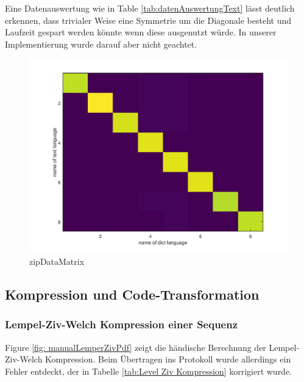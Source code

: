\documentclass[12pt,german]{article}
\begin{document}
Eine Datenauswertung wie in Table \ref{tab:datenAuswertungText} lässt deutlich erkennen, dass trivialer Weise eine Symmetrie um die Diagonale besteht und Laufzeit gespart werden könnte wenn diese ausgenutzt würde. In unserer Implementierung wurde darauf aber nicht geachtet. 


\begin{figure}[H]
	\centering
	\includegraphics[width=12cm]{images/resultZipData.jpg}
	\caption{zipDataMatrix}
	\label{fig: zipDataMatrix}
\end{figure}

\newpage

\label{fig: calculateMatrixOctaveCode}


\subsection{Kompression und Code-Transformation}
\subsubsection{Lempel-Ziv-Welch Kompression einer Sequenz}
Figure \ref{fig: manualLemperZivPdf} zeigt die händische Berechnung der Lempel-Ziv-Welch Kompression. Beim Übertragen ins Protokoll wurde allerdings ein Fehler entdeckt, der in Tabelle \ref{tab:Level Ziv Kompression} korrigiert wurde.




\label{fig: manualLemperZivPdf}
\end{document}
